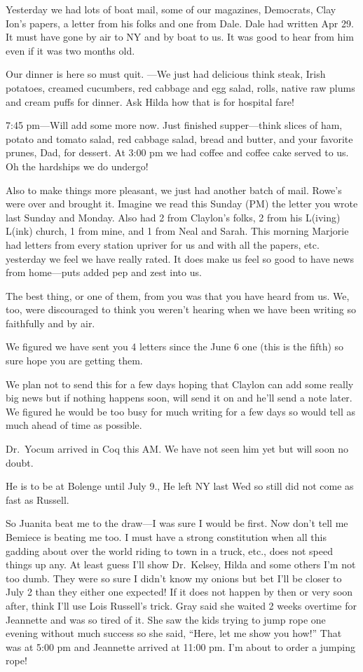 \documentclass[
]{book}
\begin{document}
Yesterday we had lots of boat mail, some of our magazines, Democrats, Clay Ion's papers, a letter from his folks and one from Dale. Dale had written Apr 29. It must have gone by air to NY and by boat to us. It was good to hear from him even if it was two months old.

Our dinner is here so must quit. ---We just had delicious think steak, Irish potatoes, creamed cucumbers, red cabbage and egg salad, rolls, native raw plums and cream puffs for dinner. Ask Hilda how that is for hospital fare!

7:45 pm---Will add some more now. Just finished supper---think slices of ham, potato and tomato salad, red cabbage salad, bread and butter, and your favorite prunes, Dad, for dessert. At 3:00 pm we had coffee and coffee cake served to us. Oh the hardships we do undergo!

Also to make things more pleasant, we just had another batch of mail. Rowe's were over and brought it. Imagine we read this Sunday (PM) the letter you wrote last Sunday and Monday. Also had 2 from Claylon's folks, 2 from his L(iving) L(ink) church, 1 from mine, and 1 from Neal and Sarah. This morning Marjorie had letters from every station upriver for us and with all the papers, etc. yesterday we feel we have really rated. It does make us feel so good to have news from home---puts added pep and zest into us.

The best thing, or one of them, from you was that you have heard from us. We, too, were discouraged to think you weren't hearing when we have been writing so faithfully and by air.

We figured we have sent you 4 letters since the June 6 one (this is the fifth) so sure hope you are getting them.

We plan not to send this for a few days hoping that Claylon can add some really big news but if nothing happens soon, will send it on and he'll send a note later. We figured he would be too busy for much writing for a few days so would tell as much ahead of time as possible.

Dr.~Yocum arrived in Coq this AM. We have not seen him yet but will soon no doubt.

He is to be at Bolenge until July 9., He left NY last Wed so still did not come as fast as Russell.

So Juanita beat me to the draw---I was sure I would be first. Now don't tell me Bemiece is beating me too. I must have a strong constitution when all this gadding about over the world riding to town in a truck, etc., does not speed things up any. At least guess I'll show Dr.~Kelsey, Hilda and some others I'm not too dumb. They were so sure I didn't know my onions but bet I'll be closer to July 2 than they either one expected! If it does not happen by then or very soon after, think I'll use Lois Russell's trick. Gray said she waited 2 weeks overtime for Jeannette and was so tired of it. She saw the kids trying to jump rope one evening without much success so she said, ``Here, let me show you how!'' That was at 5:00 pm and Jeannette arrived at 11:00 pm. I'm about to order a jumping rope!
\end{document}
